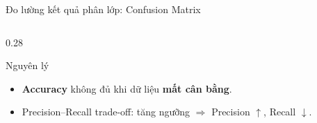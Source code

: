 \begin{frame}[shrink=40]{Đo lường kết quả phân lớp: Confusion Matrix}
\begin{columns}[T]
\begin{column}{0.28\textwidth}
            \begin{alertblock}{Nguyên lý}
                \begin{itemize}
                    \item \textbf{Accuracy} không đủ khi dữ liệu \textbf{mất cân bằng}.
                    \item Precision--Recall trade-off: tăng ngưỡng $\Rightarrow$ Precision $\uparrow$, Recall $\downarrow$.
                \end{itemize}
            \end{alertblock}
        \end{column}
    \end{columns}
\end{frame}


